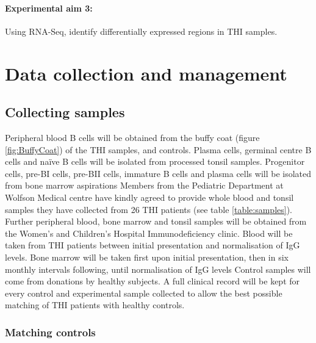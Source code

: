 \documentclass[12pt]{article}
\newcommand{\naive}{na\"{i}ve }
\begin{document}
		\paragraph{Experimental aim 3:} Using RNA-Seq, identify differentially expressed regions in THI samples.

	\section{Data collection and management}
	
		\subsection{Collecting samples}
			
			Peripheral blood B cells will be obtained from the buffy coat (figure \ref{fig:BuffyCoat}) of the THI samples, and controls. 
			Plasma cells, germinal centre B cells and \naive B cells will be isolated from processed tonsil samples. 
			Progenitor cells, pre-BI cells, pre-BII cells, immature B cells and plasma cells will be isolated from bone marrow aspirations
			Members from the Pediatric Department at Wolfson Medical centre have kindly agreed to provide whole blood and tonsil samples they have collected from 26 THI patients (see table \ref{table:samples}).
			Further peripheral blood, bone marrow and tonsil samples will be obtained from the Women's and Children's Hospital Immunodeficiency clinic. 
			Blood will be taken from THI patients between initial presentation and normalisation of IgG levels.
			Bone marrow will be taken first upon initial presentation, then in six monthly intervals following, until normalisation of IgG levels
			Control samples will come from donations by healthy subjects. 
			A full clinical record will be kept for every control and experimental sample collected to allow the best possible matching of THI patients with healthy controls. 
		
			\subsubsection{Matching controls} 
			
\end{document}
